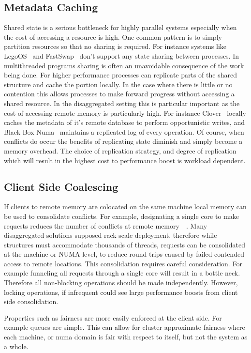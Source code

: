 \subsection{Metadata Caching}
Shared state is a serious bottleneck for highly parallel systems especially when
the cost of accessing a resource is high. One common pattern is to simply
partition resources so that no sharing is required. For instance systems like
LegoOS~\cite{legoos} and FastSwap~\cite{fastswap} don't support any state
sharing between processes. In multithreaded programs sharing is often an
unavoidable consequence of the work being done. For higher performance processes
can replicate parts of the shared structure and cache the portion locally. In
the case where there is little or no contention this allows processes to make
forward progress without accessing a shared resource. In the disaggregated
setting this is particular important as the cost of accessing remote memory is
particularly high. For instance Clover~\cite{clover} locally caches the metadata
of it's remote database to perform opportunistic writes, and Black Box
Numa~\cite{black-box-numa} maintains a replicated log of every operation. Of
course, when conflicts do occur the benefits of replicating state diminish and
simply become a memory overhead. The choice of replication strategy, and degree
of replication which will result in the highest cost to performance boost is
workload dependent.


\subsection{Client Side Coalescing}
If clients to remote memory are colocated on the same machine local memory can
be used to consolidate conflicts. For example, designating a single core to make
requests reduces the number of conflicts at remote
memory~\cite{flat-combine}~\cite{sherman}. Many disaggregated solutions supposed
rack scale deployment, therefore while structures must accommodate thousands of
threads, requests can be consolidated at the machine or NUMA level, to reduce
round trips caused by failed contended access to remote locations. This
consolidation requires careful consideration. For example funneling all requests
through a single core will result in a bottle neck. Therefore all non-blocking
operations should be made independently. However, locking operations, if
infrequent could see large performance boosts from client side consolidation.

Properties such as fairness are more easily enforced at the client side. For
example queues are simple. This can allow for cluster approximate fairness where
each machine, or numa domain is fair with respect to itself, but not the system
as a whole.


